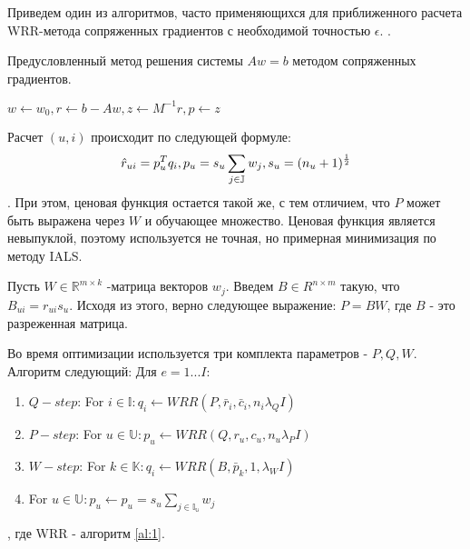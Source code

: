 \documentclass[14pt]{mmcs_article}
\begin{document}
Приведем один из алгоритмов, часто применяющихся для приближенного расчета WRR-метода сопряженных градиентов с необходимой точностью $\epsilon$. \cite{ALS:recsys}.

\begin{algorithm}[H]\label{al:1}
	\caption{Предусловленный метод решения системы $Aw = b$ методом сопряженных градиентов.}
	
	$w \leftarrow w_0, r \leftarrow b - Aw, z \leftarrow M^{-1}r, p \leftarrow z$
\end{algorithm}

Расчет $(u,i)$ происходит по следующей формуле:
 \begin{equation}\hat{r}_{ui} = p_u^T q_i, \\  p_u = s_u \sum_{j \in \mathbb{J}}w_j,\\ s_u = (n_u + 1)^{\frac{1}{2}}
 \end{equation}. При этом, ценовая функция остается такой же, с тем отличием, что $P$ может быть выражена через $W$ и обучающее множество. Ценовая функция является невыпуклой, поэтому используется не точная, но примерная минимизация по методу IALS.

Пусть $W \in \mathbb{R}^{m \times k}$ -матрица векторов $w_j$.  Введем $B \in R^{n \times m}$ такую, что $B_{ui} = r_{ui}s_u$. Исходя из этого, верно следующее выражение: $P = BW$, где $B$ - это разреженная матрица. 

Во время оптимизации используется три комплекта параметров - $P, Q, W$. Алгоритм следующий:
Для $e = 1 ... I$:
\begin{enumerate}
	\item $Q-step$: For $i \in \mathbb{I}: q_i \leftarrow WRR(P, \bar{r}_i, \bar{c}_i,n_i\lambda_QI)$
	\item $P-step$: For $u \in \mathbb{U}: p_u \leftarrow WRR(Q, r_u, c_u,n_u\lambda_PI)$
	\item $W-step$: For $k \in \mathbb{K}: q_i \leftarrow WRR(B, \bar{p}_k, 1 ,\lambda_WI)$
	\item For $u \in \mathbb{U}: p_u \leftarrow p_u = s_u\sum_{j \in \mathbb{I_u}} w_j$
\end{enumerate},
где WRR - алгоритм \ref{al:1}.
\end{document}
